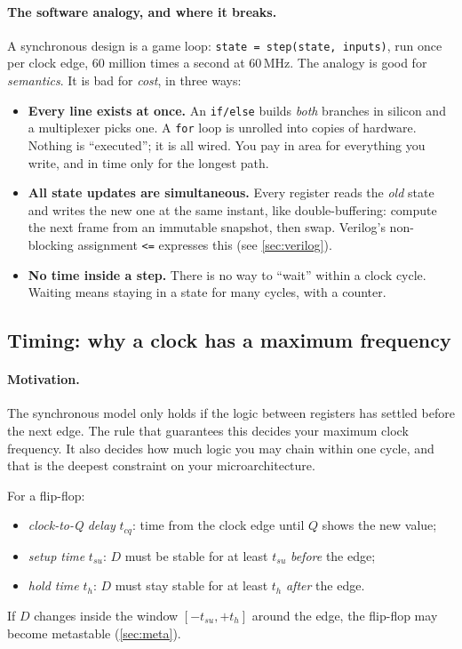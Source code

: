 \paragraph{The software analogy, and where it breaks.} A synchronous design
is a game loop: \texttt{state = step(state, inputs)}, run once per clock
edge, 60 million times a second at 60\,MHz. The analogy is good for
\emph{semantics}. It is bad for \emph{cost}, in three ways:
\begin{itemize}
  \item \textbf{Every line exists at once.} An \texttt{if/else} builds
    \emph{both} branches in silicon and a multiplexer picks one. A
    \texttt{for} loop is unrolled into copies of hardware. Nothing is
    ``executed''; it is all wired. You pay in area for everything you write,
    and in time only for the longest path.
  \item \textbf{All state updates are simultaneous.} Every register reads the
    \emph{old} state and writes the new one at the same instant, like
    double-buffering: compute the next frame from an immutable snapshot,
    then swap. Verilog's non-blocking assignment \texttt{<=} expresses this
    (see \cref{sec:verilog}).
  \item \textbf{No time inside a step.} There is no way to ``wait'' within
    a clock cycle. Waiting means staying in a state for many cycles, with a
    counter.
\end{itemize}

\subsection{Timing: why a clock has a maximum frequency}\label{sec:timing}

\paragraph{Motivation.} The synchronous model only holds if the logic between
registers has settled before the next edge. The rule that guarantees this
decides your maximum clock frequency. It also decides how much logic you may
chain within one cycle, and that is the deepest constraint on your
microarchitecture.

\begin{definition}
For a flip-flop:
\begin{itemize}
  \item \emph{clock-to-Q delay} $t_{cq}$: time from the clock edge until $Q$
    shows the new value;
  \item \emph{setup time} $t_{su}$: $D$ must be stable for at least $t_{su}$
    \emph{before} the edge;
  \item \emph{hold time} $t_h$: $D$ must stay stable for at least $t_h$
    \emph{after} the edge.
\end{itemize}
If $D$ changes inside the window $[-t_{su}, +t_h]$ around the edge, the
flip-flop may become metastable (\cref{sec:meta}).
\end{definition}


